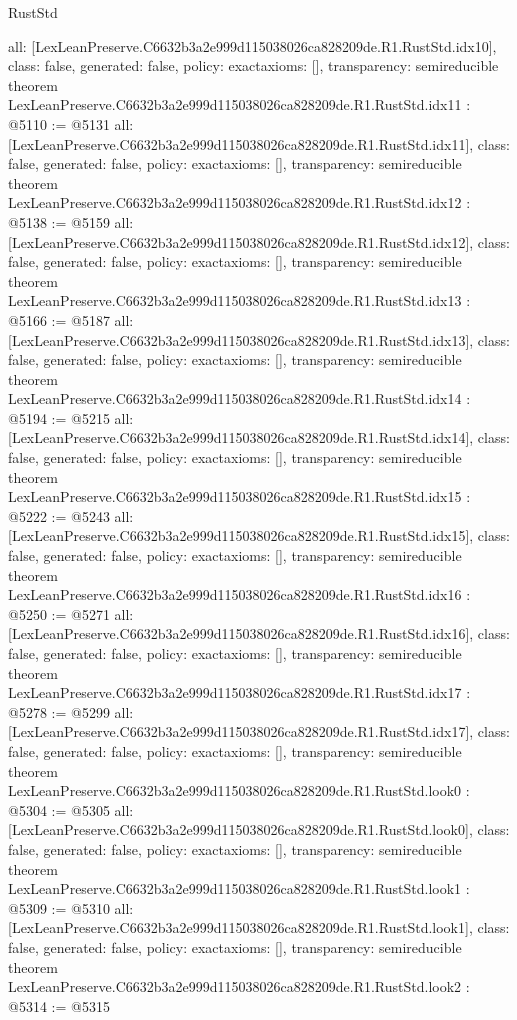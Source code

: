\begin{lexlean}{RustStd}
\begin{coremodule}
{  all: [LexLeanPreserve.C6632b3a2e999d115038026ca828209de.R1.RustStd.idx10],
  class: false,
  generated: false,
  policy: exact{axioms: []},
  transparency: semireducible
}
theorem LexLeanPreserve.C6632b3a2e999d115038026ca828209de.R1.RustStd.idx11 : @5110 := @5131 {
  all: [LexLeanPreserve.C6632b3a2e999d115038026ca828209de.R1.RustStd.idx11],
  class: false,
  generated: false,
  policy: exact{axioms: []},
  transparency: semireducible
}
theorem LexLeanPreserve.C6632b3a2e999d115038026ca828209de.R1.RustStd.idx12 : @5138 := @5159 {
  all: [LexLeanPreserve.C6632b3a2e999d115038026ca828209de.R1.RustStd.idx12],
  class: false,
  generated: false,
  policy: exact{axioms: []},
  transparency: semireducible
}
theorem LexLeanPreserve.C6632b3a2e999d115038026ca828209de.R1.RustStd.idx13 : @5166 := @5187 {
  all: [LexLeanPreserve.C6632b3a2e999d115038026ca828209de.R1.RustStd.idx13],
  class: false,
  generated: false,
  policy: exact{axioms: []},
  transparency: semireducible
}
theorem LexLeanPreserve.C6632b3a2e999d115038026ca828209de.R1.RustStd.idx14 : @5194 := @5215 {
  all: [LexLeanPreserve.C6632b3a2e999d115038026ca828209de.R1.RustStd.idx14],
  class: false,
  generated: false,
  policy: exact{axioms: []},
  transparency: semireducible
}
theorem LexLeanPreserve.C6632b3a2e999d115038026ca828209de.R1.RustStd.idx15 : @5222 := @5243 {
  all: [LexLeanPreserve.C6632b3a2e999d115038026ca828209de.R1.RustStd.idx15],
  class: false,
  generated: false,
  policy: exact{axioms: []},
  transparency: semireducible
}
theorem LexLeanPreserve.C6632b3a2e999d115038026ca828209de.R1.RustStd.idx16 : @5250 := @5271 {
  all: [LexLeanPreserve.C6632b3a2e999d115038026ca828209de.R1.RustStd.idx16],
  class: false,
  generated: false,
  policy: exact{axioms: []},
  transparency: semireducible
}
theorem LexLeanPreserve.C6632b3a2e999d115038026ca828209de.R1.RustStd.idx17 : @5278 := @5299 {
  all: [LexLeanPreserve.C6632b3a2e999d115038026ca828209de.R1.RustStd.idx17],
  class: false,
  generated: false,
  policy: exact{axioms: []},
  transparency: semireducible
}
theorem LexLeanPreserve.C6632b3a2e999d115038026ca828209de.R1.RustStd.look0 : @5304 := @5305 {
  all: [LexLeanPreserve.C6632b3a2e999d115038026ca828209de.R1.RustStd.look0],
  class: false,
  generated: false,
  policy: exact{axioms: []},
  transparency: semireducible
}
theorem LexLeanPreserve.C6632b3a2e999d115038026ca828209de.R1.RustStd.look1 : @5309 := @5310 {
  all: [LexLeanPreserve.C6632b3a2e999d115038026ca828209de.R1.RustStd.look1],
  class: false,
  generated: false,
  policy: exact{axioms: []},
  transparency: semireducible
}
theorem LexLeanPreserve.C6632b3a2e999d115038026ca828209de.R1.RustStd.look2 : @5314 := @5315 {
}
\end{coremodule}
\end{lexlean}
